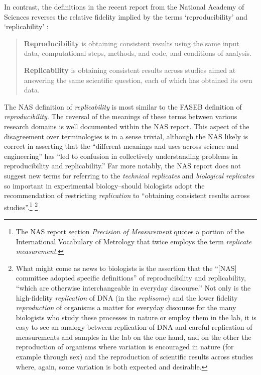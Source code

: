  In contrast, the definitions in the recent report from the National Academy of Sciences reverses the relative
	 fidelity implied by the terms `reproducibility' and `replicability' \cite[p.4]{committeeonreproducibilityandreplicabilityinscience2019reproducibility}: 
\begin{quote}
	\textbf{Reproducibility} is obtaining consistent results using the same input data, computational
	steps, methods, and code, and conditions of analysis.  \medskip

	\textbf{Replicability} is obtaining consistent results across studies aimed at answering the same
	scientific question, each of which has obtained its own data.
\end{quote}
      
The NAS definition of \emph{replicability} is most similar to the FASEB definition of \emph{reproducibility}.
The reversal of the meanings of these terms between various research domains is well documented within the NAS report.
This aspect of the disagreement over terminologies is in a sense trivial, although the NAS likely is correct in  
	asserting that the ``different meanings and uses across science and engineering'' has ``led to confusion in collectively 
	understanding problems in reproducibility and replicability.''
Far more notably, the NAS report does not suggest new terms for referring to the \emph{technical replicates} 
	and  \emph{biological replicates} so important in experimental biology--should biologists adopt the recommendation 
	of restricting \emph{replication} to ``obtaining consistent results across studies''.\footnote{
		The NAS report section \emph{Precision of Measurement} quotes a portion of the International Vocabulary of
		Metrology that twice employs the term \emph{replicate measurement}.
	}
\footnote{
What might come as news to biologists is the assertion that the ``[NAS] committee adopted specific definitions'' of 
	reproducibility and replicability, ``which are otherwise interchangeable in everyday discourse.''
Not only is the high-fidelity \emph{replication} of DNA (in the \emph{replisome}) and the lower fidelity \emph{reproduction}
of organisms a matter for everyday discourse for the many biologists who study these processes in nature or employ them in the lab,
	it is easy to see an analogy between replication of DNA and careful replication of measurements and samples
	in the lab on the one hand, and on the other the reproduction of organisms where variation is encouraged in nature
	(for example through sex) and the reproduction of scientific results across studies where, again, some variation is both 
	expected and desirable.}

